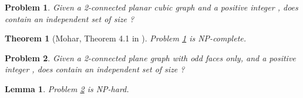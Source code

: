 \documentclass{article}
\newtheorem{theorem}{Theorem}
\newtheorem{problem}{Problem}
\newtheorem{lemma}{Lemma}
\begin{document}
\begin{problem}\label{prob:2connplcubic}
Given a 2-connected planar cubic graph  and a positive integer , does 
contain an independent set of size ?
\end{problem}

\begin{theorem}[Mohar, Theorem 4.1 in \cite{mohar2001face}]\label{thm:2connplcubic}
Problem \ref{prob:2connplcubic} is NP-complete.
\end{theorem}


\begin{problem}\label{prob:2connplodd}
Given a 2-connected plane graph  with odd faces only, and a positive integer , does 
contain an independent set of size ?
\end{problem}


\begin{lemma}\label{indep}
Problem \ref{prob:2connplodd} is NP-hard.
\end{lemma}
\end{document}
